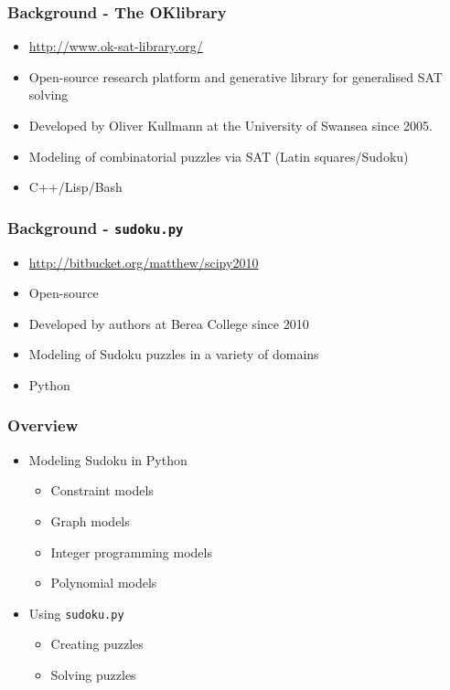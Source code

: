 \documentclass{beamer}
\title{\talktitle}
\author{\Us}
\date{\talkdate}
\begin{document}
\begin{frame}
  \titlepage
  \conferencebanner
\end{frame}

\begin{frame}
\frametitle{Background - The OKlibrary}
 \begin{itemize}
  \item<1-> \url{http://www.ok-sat-library.org/}
  \item<2-> Open-source research platform and generative library for generalised SAT solving
  \item<3-> Developed by Oliver Kullmann at the University of Swansea since 2005.
  \item<4-> Modeling of combinatorial puzzles via SAT (Latin squares/Sudoku)
  \item<5-> C++/Lisp/Bash
 \end{itemize}
\end{frame}

\begin{frame}
\frametitle{Background - \texttt{sudoku.py}}
 \begin{itemize}
  \item<1-> \url{http://bitbucket.org/matthew/scipy2010}
  \item<2-> Open-source 
  \item<3-> Developed by authors at Berea College since 2010
  \item<4-> Modeling of Sudoku puzzles in a variety of domains
  \item<5-> Python
 \end{itemize}
\end{frame}

\begin{frame}
\frametitle{Overview}
 \begin{itemize}
  \item<1-> {Modeling Sudoku in Python
    \begin{itemize}
      \item<2-> Constraint models
      \item<3-> Graph models
      \item<4-> Integer programming models
      \item<5-> Polynomial models
    \end{itemize}}
  \item<6-> {Using \texttt{sudoku.py} 
    \begin{itemize}
      \item<7-> Creating puzzles
      \item<8-> Solving puzzles
    \end{itemize}}
 \end{itemize}
\end{frame}
\end{document}
